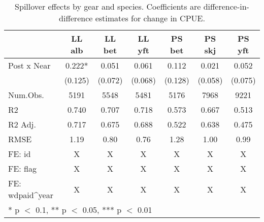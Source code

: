 \begin{table}

\caption{\label{tab:spp_reg}Spillover effects by gear and species. Coefficients are
             difference-in-difference estimates for change in CPUE.}
\centering
\begin{tabular}[t]{lcccccc}
\toprule
  & LL alb & LL bet & LL yft & PS bet & PS skj & PS yft\\
\midrule
Post x Near & \num{0.222}* & \num{0.051} & \num{0.061} & \num{0.112} & \num{0.021} & \num{0.052}\\
 & (\num{0.125}) & (\num{0.072}) & (\num{0.068}) & (\num{0.128}) & (\num{0.058}) & (\num{0.075})\\
\midrule
Num.Obs. & \num{5191} & \num{5548} & \num{5481} & \num{5176} & \num{7968} & \num{9221}\\
R2 & \num{0.740} & \num{0.707} & \num{0.718} & \num{0.573} & \num{0.667} & \num{0.513}\\
R2 Adj. & \num{0.717} & \num{0.675} & \num{0.688} & \num{0.522} & \num{0.638} & \num{0.475}\\
RMSE & \num{1.19} & \num{0.80} & \num{0.76} & \num{1.28} & \num{1.00} & \num{0.99}\\
FE: id & X & X & X & X & X & X\\
FE: flag & X & X & X & X & X & X\\
FE: wdpaid^year & X & X & X & X & X & X\\
\bottomrule
\multicolumn{7}{l}{\rule{0pt}{1em}* p $<$ 0.1, ** p $<$ 0.05, *** p $<$ 0.01}\\
\end{tabular}
\end{table}
